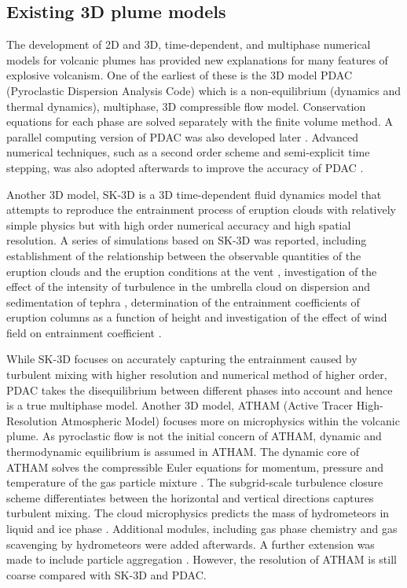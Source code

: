 \subsection{Existing 3D plume models}

The development of 2D and 3D, time-dependent, and multiphase numerical models for volcanic plumes has provided new explanations for many features of explosive volcanism. One of the earliest of these is the 3D model PDAC (Pyroclastic Dispersion Analysis Code) \citep{neri2003multiparticle}  which is a non-equilibrium (dynamics and thermal dynamics), multiphase, 3D compressible flow model. Conservation equations for each phase are solved separately with the finite volume method. A parallel computing version of PDAC was also developed later \citep{ongaro2007parallel}. Advanced numerical techniques, such as a second order scheme and semi-explicit time stepping, was also adopted afterwards to improve the accuracy of PDAC \citep{carcano2013semi}. 

Another 3D model, SK-3D \citep{suzuki2005numerical} is a 3D time-dependent fluid dynamics model that attempts to reproduce the entrainment process of eruption clouds with relatively simple physics but with high order numerical accuracy and high spatial resolution.
A series of simulations based on SK-3D was reported, including establishment of the relationship between the observable quantities of the eruption clouds and the eruption conditions at the vent \citep{suzuki2009three}, investigation of the effect of the intensity of turbulence in the umbrella cloud on dispersion and sedimentation of tephra \citep{koyaguchi2009effect}, determination of the entrainment coefficients of eruption columns as a function of height \citep{suzuki2010numerical} and investigation of the effect of wind field on entrainment coefficient \citep{suzuki20133d}. 

While SK-3D focuses on accurately capturing the entrainment caused by turbulent mixing with higher resolution and numerical method of higher order, PDAC takes the disequilibrium between different phases into account and hence is a true multiphase model. Another 3D model, ATHAM (Active Tracer High-Resolution Atmospheric Model) \citep{oberhuber1998volcanic} focuses more on microphysics within the volcanic plume. As pyroclastic flow is not the initial concern of ATHAM, dynamic and thermodynamic equilibrium is assumed in ATHAM. The dynamic core of ATHAM solves the compressible Euler equations for momentum, pressure and temperature of the gas particle mixture \citep{oberhuber1998volcanic}. The subgrid-scale turbulence closure scheme differentiates between the horizontal and vertical directions \citep{herzog2003prognostic} captures turbulent mixing. The cloud microphysics predicts the mass of hydrometeors in liquid and ice phase \citep{herzog1998effect}. Additional modules, including gas phase chemistry \citep{trentmann2002simulation} and gas scavenging by hydrometeors \citep{textor2003injection} were added afterwards. A further extension was made to include particle aggregation \citep{textor2006volcanic1, textor2006volcanic2}. However, the resolution of ATHAM is still coarse compared with SK-3D and PDAC.

